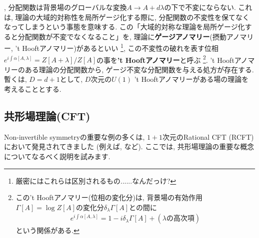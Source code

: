 , 分配関数は背景場のグローバルな変換$A\to A+ d\lambda$の下で不変にならない. 
これは, 理論の大域的対称性を局所ゲージ化する際に, 分配関数の不変性を保てなくなってしまうという事態を意味する. 
この「大域的対称な理論を局所ゲージ化すると分配関数が不変でなくなること」を, 理論に\textbf{ゲージアノマリー}(摂動アノマリー, 't Hooftアノマリー)があるといい
\footnote{厳密にはこれらは区別されるもの......なんだっけ?}, 
この不変性の破れを表す位相$e^{i\int \alpha[A, \lambda]}=Z[A+\lambda]/Z[A]$の事を\textbf{'t Hooftアノマリー}と呼ぶ
\footnote{この't Hooftアノマリー(位相の変化分)は, 背景場の有効作用$\Gamma[A]=\log Z[A]$の変化分$\delta_\lambda \Gamma[A]$との間に
\begin{align}
    e^{i\int \alpha[A, \lambda]} = 1-i\delta_\lambda \Gamma[A] + (\lambda の高次項)
\end{align}
という関係がある. }. 
 't Hooftアノマリーのある理論の分配関数から, ゲージ不変な分配関数を与える処方が存在する. 
 暫くは, $D=d+1$として, $D$次元の$U(1)$ 't Hooftアノマリーがある場の理論を考えることとする. 
\subsection{共形場理論(CFT)}
Non-invertible symmetryの重要な例の多くは, $1+1$次元のRational CFT (RCFT)において発見されてきました
(例えば, \cite{EV}など). 
ここでは, 共形場理論の重要な概念についてなるべく説明を試みます. 
